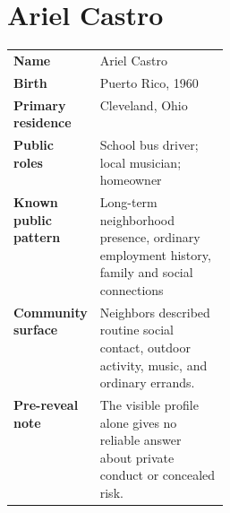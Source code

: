 \chapter{Ariel Castro}


\begin{center}
\end{center}

\vspace{0.2em}

\begin{tabularx}{\linewidth}{>{\bfseries}p{0.28\linewidth}X}
Name & Ariel Castro\\
Birth & Puerto Rico, 1960\\
Primary residence & Cleveland, Ohio\\
Public roles & School bus driver; local musician; homeowner\\
Known public pattern & Long-term neighborhood presence, ordinary employment history, family and social connections\\
Community surface & Neighbors described routine social contact, outdoor activity, music, and ordinary errands.\\
Pre-reveal note & The visible profile alone gives no reliable answer about private conduct or concealed risk.\\
\end{tabularx}

\vfill

\begin{center}
\end{center}

